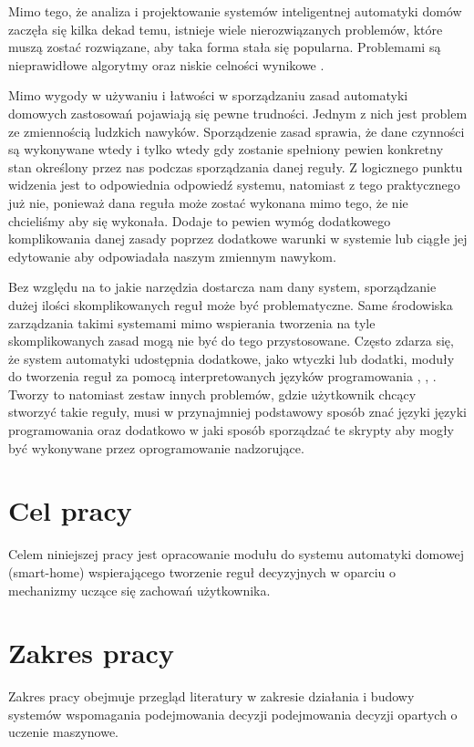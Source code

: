 Mimo tego, że analiza i projektowanie systemów inteligentnej automatyki domów zaczęła się kilka dekad temu, istnieje wiele nierozwiązanych problemów, które muszą zostać rozwiązane, aby taka forma stała się popularna. Problemami są nieprawidłowe algorytmy oraz niskie celności wynikowe \cite{episode_discovery_2}.

Mimo wygody w używaniu i łatwości w sporządzaniu zasad automatyki domowych zastosowań pojawiają się pewne trudności. Jednym z nich jest problem ze zmiennością ludzkich nawyków. Sporządzenie zasad sprawia, że dane czynności są wykonywane wtedy i tylko wtedy gdy zostanie spełniony pewien konkretny stan określony przez nas podczas sporządzania danej reguły. Z logicznego punktu widzenia jest to odpowiednia odpowiedź systemu, natomiast z tego praktycznego już nie, ponieważ dana reguła może zostać wykonana mimo tego, że nie chcieliśmy aby się wykonała. Dodaje to pewien wymóg dodatkowego komplikowania danej zasady poprzez dodatkowe warunki w systemie lub ciągłe jej edytowanie aby odpowiadała naszym zmiennym nawykom.

Bez względu na to jakie narzędzia dostarcza nam dany system, sporządzanie dużej ilości skomplikowanych reguł może być problematyczne. Same środowiska zarządzania takimi systemami mimo wspierania tworzenia na tyle skomplikowanych zasad mogą nie być do tego przystosowane. Często zdarza się, że system automatyki udostępnia dodatkowe, jako wtyczki lub dodatki, moduły do tworzenia reguł za pomocą interpretowanych języków programowania \cite{appdaemon:main}, \cite{domoticz:scripts}, \cite{openhab:scripts}. Tworzy to natomiast zestaw innych problemów, gdzie użytkownik chcący stworzyć takie reguły, musi w przynajmniej podstawowy sposób znać języki języki programowania oraz dodatkowo w jaki sposób sporządzać te skrypty aby mogły być wykonywane przez oprogramowanie nadzorujące.



\section{Cel pracy}
Celem niniejszej pracy jest opracowanie modułu do systemu automatyki domowej (smart-home) wspierającego tworzenie reguł decyzyjnych w oparciu o mechanizmy uczące się zachowań użytkownika.


\section{Zakres pracy}
Zakres pracy obejmuje przegląd literatury w zakresie działania i budowy systemów wspomagania podejmowania decyzji podejmowania decyzji opartych o uczenie maszynowe.


